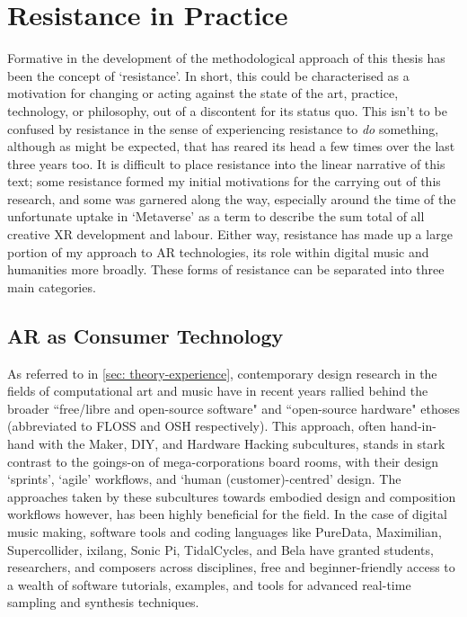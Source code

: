 \section{Resistance in Practice} \label{sec: method-resistance}
Formative in the development of the methodological approach of this thesis has been the concept of `resistance'. In short, this could be characterised as a motivation for changing or acting against the state of the art, practice, technology, or philosophy, out of a discontent for its status quo. This isn't to be confused by resistance in the sense of experiencing resistance to \textit{do} something, although as might be expected, that has reared its head a few times over the last three years too. It is difficult to place resistance into the linear narrative of this text; some resistance formed my initial motivations for the carrying out of this research, and some was garnered along the way, especially around the time of the unfortunate uptake in `Metaverse' as a term to describe the sum total of all creative XR development and labour. Either way, resistance has made up a large portion of my approach to AR technologies, its role within digital music and humanities more broadly. These forms of resistance can be separated into three main categories.

\subsection{AR as Consumer Technology} \label{sec: method-resistance-maker}
As referred to in \autoref{sec: theory-experience}, contemporary design research in the fields of computational art and music have in recent years rallied behind the broader ``free/libre and open-source software" and ``open-source hardware" ethoses (abbreviated to FLOSS and OSH respectively). This approach, often hand-in-hand with the Maker, DIY, and Hardware Hacking subcultures, stands in stark contrast to the goings-on of mega-corporations board rooms, with their design `sprints', `agile' workflows, and `human (customer)-centred' design. The approaches taken by these subcultures towards embodied design and composition workflows however, has been highly beneficial for the field. In the case of digital music making, software tools and coding languages like PureData, Maximilian, Supercollider, ixilang, Sonic Pi, TidalCycles, and Bela have granted students, researchers, and composers across disciplines, free and beginner-friendly access to a wealth of software tutorials, examples, and tools for advanced real-time sampling and synthesis techniques.

